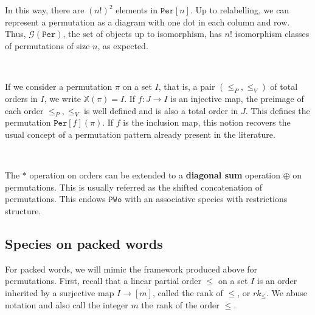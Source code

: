 \documentclass[12pt, reqno]{amsart}
\theoremstyle{definition}
\begin{document}
In this way, there are $(n!)^2 $ elements in $\mathtt{Per}[n]$.
Up to relabelling, we can represent a permutation as a diagram with one dot in each column and row.
Thus, $\mathcal{G}(\mathtt{Per})$, the set of objects up to isomorphism, has $n!$ isomorphism classes of permutations of size $n$, as expected.

\

\label{defin:per}
If we consider a permutation $\pi$ on a set $I$, that is, a pair $(\leq_P, \leq_V) $ of total orders in $I$, we write $\mathbb{X}(\pi) = I$.
If $f:J \to I $ is an injective map, the preimage of each order $\leq_P, \leq_V$ is well defined and is also a total order in $J$.
This defines the permutation $\mathtt{Per}[f](\pi )$.
If $f$ is the inclusion map, this notion recovers the usual concept of a permutation pattern already present in the literature.

\

The $\ast $ operation on orders can be extended to a \textbf{diagonal sum} operation $\oplus $ on permutations.
This is usually referred as the shifted concatenation of permutations.
This endows $\mathtt{PWo}$ with an  associative species with restrictions structure.



\subsection{Species on packed words}


For packed words, we will mimic the framework produced above for permutations.
First, recall that a linear partial order $\leq$ on a set $I$ is an order inherited by a surjective map $I \to [m]$, called the rank of $\leq$, or $rk_{\leq}$.
We abuse notation and also call the integer $m$ the rank of the order $\leq$.
\end{document}
